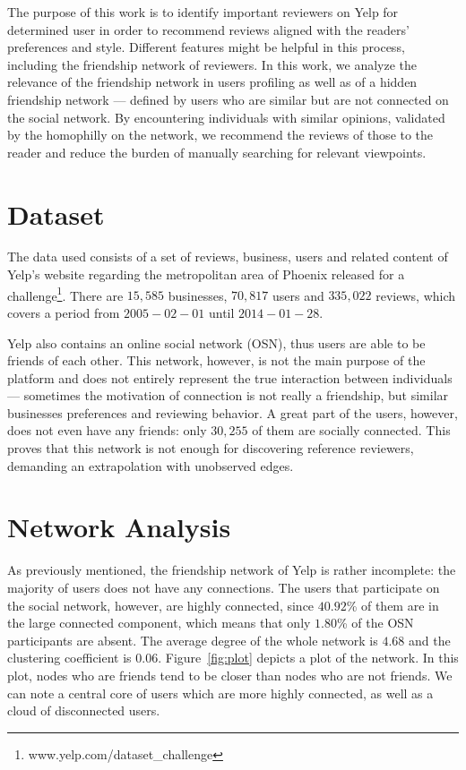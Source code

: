 \documentclass[12pt]{article}
\begin{document}
The purpose of this work is to identify important reviewers on Yelp for
determined user in order to recommend reviews aligned with the readers'
preferences and style. Different features might be helpful in this process,
including the friendship network of reviewers. In this work, we analyze the
relevance of the friendship network in users profiling as well as of a hidden
friendship network --- defined by users who are similar but are not connected on
the social network. By encountering individuals with similar opinions, validated
by the homophilly on the network, we recommend the reviews of those to the
reader and reduce the burden of manually searching for relevant viewpoints.


\section{Dataset}
The data used consists of a set of reviews, business, users and related content
of Yelp's website regarding the metropolitan area of Phoenix released for a
challenge\footnote{www.yelp.com/dataset\_challenge}. There are $15,585$
businesses, $70,817$ users and $335,022$ reviews, which covers a period from
$2005-02-01$ until $2014-01-28$.

Yelp also contains an online social network (OSN), thus users are able to be
friends of each other. This network, however, is not the main purpose of the
platform and does not entirely represent the true interaction between
individuals --- sometimes the motivation of connection is not really a
friendship, but similar businesses preferences and reviewing behavior. A great
part of the users, however, does not even have any friends: only $30,255$ of
them are socially connected. This proves that this network is not enough for
discovering reference reviewers, demanding an extrapolation with unobserved
edges.


\section{Network Analysis}
As previously mentioned, the friendship network of Yelp is rather incomplete:
the majority of users does not have any connections. The users that participate
on the social network, however, are highly connected, since $40.92$\% of them
are in the large connected component, which means that only $1.80$\% of the OSN
participants are absent. The average degree of the whole network is $4.68$ and
the clustering coefficient is $0.06$. Figure~\ref{fig:plot} depicts a plot of the
network. In this plot, nodes who are friends tend to be closer than nodes who are
not friends. We can note a central core of users which are more highly connected, as well
as a cloud of disconnected users.
\end{document}
